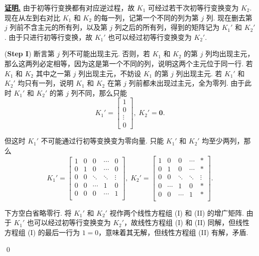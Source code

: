 \documentclass[10pt,openany]{article}
\theoremstyle{thmstyle} %
\theoremstyle{defstyle} %
\theoremstyle{prostyle} %
\theoremstyle{exastyle}
\theoremstyle{remstyle}
\renewenvironment{proof}[1][证明]{\par\underline{\textbf{#1.}} \;\fangsong}{\qed\par}
\begin{document}
\begin{proof}
	由于初等行变换都有对应逆过程，故 \( K_1 \) 可经过若干次初等行变换变为 \( K_2 \). 现在从左到右对比 \( K_1 \) 和 \( K_2 \) 的每一列，记第一个不同的列为第 \( j \) 列. 现在删去第 \( j \) 列前不含主元的所有列，以及第 \( j \) 列之后的所有列，得到的矩阵记为 \( K_1' \) 和 \( K_2' \). 由于只进行初等行变换，故 \( K_1' \) 也可以经过初等行变换变为 \( K_2' \).
	
	(\textbf{Step I}) 断言第 \( j \) 列不可能出现主元. 否则，若 \( K_1 \) 和 \( K_2 \) 的第 \( j \) 列均出现主元，那么这两列必定相等，因为这是第一个不同的列，说明这两个主元位于同一行. 若 \( K_1 \) 和 \( K_2 \) 其中之一第 \( j \) 列出现主元，不妨设 \( K_1 \) 的第 \( j \) 列出现主元. 若 \( K_1' \) 和 \( K_2' \) 均只有一列，说明 \( K_1 \) 和 \( K_2 \) 在第 \( j \) 列前都未出现过主元，全为零列. 由于此时 \( K_1' \) 和 \( K_2' \) 的第 \( j \) 列不同，那么只能
	\[ K_1'= \begin{bmatrix}
		1 \\ 0 \\ \vdots \\ 0
	\end{bmatrix}, \; K_2'= \bm{0}. \]
	
	但这时 \( K_1' \) 不可能通过行初等变换变为零向量. 只能 \( K_1' \) 和 \( K_2' \) 均至少两列，那么
	\[ K_1'= \begin{bmatrix}
		1 & 0 & 0  & \cdots & 0 \\
		0 & 1 & 0 & \cdots & 0 \\
		0 & 0 & \ddots & \ddots & \vdots \\
		0 & 0 & \cdots & 1 & 0 \\
		0 & 0 & 0 & \cdots & 1 \\
		 &  &  &  & 
	\end{bmatrix}, \; K_2'=\begin{bmatrix}
	1 & 0 & 0  & \cdots & * \\
	0 & 1 & 0   & \cdots & * \\
	0 & 0 & \ddots & \ddots & \vdots \\
	0 &  \cdots & 1  & 0 & * \\
	0 & 0  & \cdots & 1 & * \\
	 &  &  &  &   
	\end{bmatrix}.  \]
	
	下方空白省略零行. 将 \( K_1' \) 和 \( K_2' \) 视作两个线性方程组 (I) 和 (II) 的增广矩阵. 由于 \( K_1' \) 也可以经过初等行变换变为 \( K_2' \)，故线性方程组 (I) 和 (II) 同解，但线性方程组 (I) 的最后一行为 \( 1=0 \)，意味着其无解，但线性方程组 (II) 有解，矛盾.
	

\end{proof}
\end{document}
